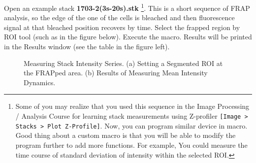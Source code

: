 \documentclass[11pt,a4paper,oneside]{report}
\newcommand{\ilcom}[1]{\texttt{\small#1}}
\begin{document}
Open an example stack \textbf{1703-2(3s-20s).stk}
\footnote{Some of you may realize that you used this sequence 
in the Image Processing / Analysis Course for learning 
stack measurements using Z-profiler \ilcom{[Image > Stacks > Plot Z-Profile]}. Now, you can program similar 
device in macro. Good thing about a custom macro 
is that you will be able to modify the program further to add more functions.
For example, You could measure the time course of standard deviation of
intensity within the selected ROI.}. This is a short sequence of FRAP analysis,
so the edge of the one of the cells is bleached and then fluorescence signal at that bleached position recovers by time. 
Select the frapped region by ROI tool (such as in the figure below). 
Execute the macro. Results will be printed in the Results window (see the table in the figure left). 

\begin{figure}[htbp]
 \centering
 \caption{Measuring Stack Intensity Series. (a) Setting a Segmented ROI at the FRAPped area. (b) Results of Measuring Mean Intensity Dynamics.}
 \label{fig:frapresults}
\end{figure}
\end{document}
